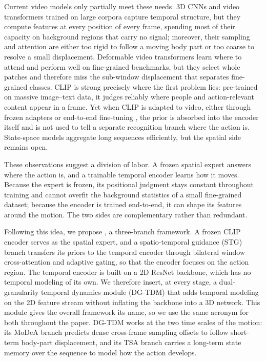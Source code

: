 Current video models only partially meet these needs. 3D CNNs
\cite{carreira2017slowfast,feichtenhofer2019slowfast} and video transformers
trained on large corpora
\cite{bertasius2021timesformer,liu2022videoswin,tong2022videomae,wang2024internvideo}
capture temporal structure, but they compute features at every position of
every frame, spending most of their capacity on background regions that carry
no signal; moreover, their sampling and attention are either too rigid to
follow a moving body part or too coarse to resolve a small displacement.
Deformable video transformers \cite{dvt2022} learn where to attend and perform
well on fine-grained benchmarks, but they select whole patches and therefore
miss the sub-window displacement that separates fine-grained classes. CLIP
\cite{radford2021clip} is strong precisely where the first problem lies:
pre-trained on massive image--text data, it judges reliably where people and
action-relevant content appear in a frame. Yet when CLIP is adapted to video,
either through frozen adapters \cite{lin2022evl} or end-to-end fine-tuning
\cite{rasheed2023vificlip}, the prior is absorbed into the encoder itself and
is not used to tell a separate recognition branch where the action is.
State-space models \cite{dao2023mamba,videomamba2024} aggregate long sequences
efficiently, but the spatial side remains open.

These observations suggest a division of labor. A frozen spatial expert
answers where the action is, and a trainable temporal encoder learns how it
moves. Because the expert is frozen, its positional judgment stays constant
throughout training and cannot overfit the background statistics of a small
fine-grained dataset; because the encoder is trained end-to-end, it can shape
its features around the motion. The two sides are complementary rather than
redundant.

Following this idea, we propose \dgtdm, a three-branch framework. A frozen
CLIP encoder serves as the spatial expert, and a spatio-temporal guidance
(STG) branch transfers its priors to the temporal encoder through bilateral
window cross-attention and adaptive gating, so that the encoder focuses on
the action region. The temporal encoder is built on a 2D ResNet backbone,
which has no temporal modeling of its own. We therefore insert, at every
stage, a dual-granularity temporal dynamics module (DG-TDM) that adds temporal
modeling on the 2D feature stream without inflating the backbone into a 3D
network. This module gives the overall framework its name, so we use the same
acronym for both throughout the paper. DG-TDM works at the two time scales of the motion: its MoDeA branch
predicts dense cross-frame sampling offsets to follow short-term body-part
displacement, and its TSA branch carries a long-term state memory over the
sequence to model how the action develops.

